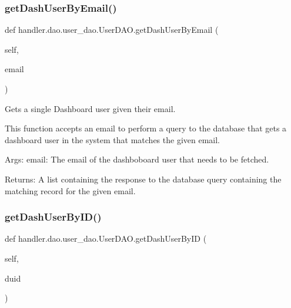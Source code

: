 \subsubsection{\texorpdfstring{get\+Dash\+User\+By\+Email()}{getDashUserByEmail()}}
{\footnotesize\ttfamily def handler.\+dao.\+user\+\_\+dao.\+User\+D\+A\+O.\+get\+Dash\+User\+By\+Email (\begin{DoxyParamCaption}\item[{}]{self,  }\item[{}]{email }\end{DoxyParamCaption})}

\begin{DoxyVerb}Gets a single Dashboard user given their email.

This function accepts an email to perform a query to the database that
gets a dashboard user in the system that matches the given email.

Args:
    email: The email of the dashboboard user that needs to be fetched.

Returns:
    A list containing the response to the database query
    containing the matching record for the given email.
\end{DoxyVerb}
 \mbox{\label{classhandler_1_1dao_1_1user__dao_1_1_user_d_a_o_ad9be9aa0752a73abc15d413ff6f6f640}} 
\subsubsection{\texorpdfstring{get\+Dash\+User\+By\+I\+D()}{getDashUserByID()}}
{\footnotesize\ttfamily def handler.\+dao.\+user\+\_\+dao.\+User\+D\+A\+O.\+get\+Dash\+User\+By\+ID (\begin{DoxyParamCaption}\item[{}]{self,  }\item[{}]{duid }\end{DoxyParamCaption})}

